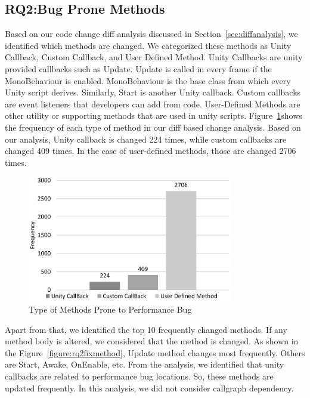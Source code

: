 \subsection{RQ2:Bug Prone Methods}
\label{subsec:bugmethod}
Based on our code change diff analysis discussed in Section~\ref{sec:diffanalysis}, we identified which methods are changed. We categorized these methods as Unity Callback, Custom Callback, and User Defined Method. Unity Callbacks are unity provided callbacks such as Update. Update is called in every frame if the MonoBehaviour is enabled. MonoBehaviour is the base class from which every Unity script derives. Similarly, Start is another Unity callback. Custom callbacks are event listeners that developers can add from code. User-Defined Methods are other utility or supporting methods that are used in unity scripts. Figure~\ref{figure:rq2methodtype}shows the frequency of each type of method in our diff based change analysis. Based on our analysis, Unity callback is changed 224 times, while custom callbacks are changed 409 times. In the case of user-defined methods, those are changed 2706 times.

\begin{figure}[t]
	\centering
	\includegraphics[width=0.8\textwidth]{figure/rq2_1.eps}
	\caption{Type of Methods Prone to Performance Bug}
	\label{figure:rq2methodtype}
\end{figure}

Apart from that, we identified the top 10 frequently changed methods. If any method body is altered, we considered that the method is changed. As shown in the Figure~\ref{figure:rq2fixmethod}, Update method changes most frequently. Others are Start, Awake, OnEnable, etc. From the analysis, we identified that unity callbacks are related to performance bug locations. So, these methods are updated frequently. In this analysis, we did not consider callgraph dependency.

